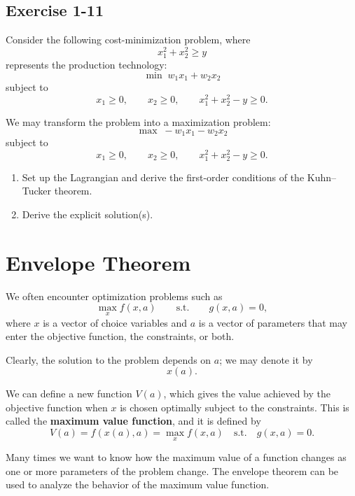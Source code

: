 \begin{tcolorbox}[breakable]

\subsection*{Exercise 1-11}

Consider the following cost-minimization problem, where
\[
x_1^2 + x_2^2 \ge y
\]
represents the production technology:
\[
\min \; w_1 x_1 + w_2 x_2
\]
subject to
\[
x_1 \ge 0,\qquad x_2 \ge 0,\qquad x_1^2 + x_2^2 - y \ge 0.
\]

We may transform the problem into a maximization problem:
\[
\max \; -w_1 x_1 - w_2 x_2
\]
subject to
\[
x_1 \ge 0,\qquad x_2 \ge 0,\qquad x_1^2 + x_2^2 - y \ge 0.
\]

\begin{enumerate}
    \item[(i)] Set up the Lagrangian and derive the first-order conditions
    of the Kuhn--Tucker theorem.
    \item[(ii)] Derive the explicit solution(s).
\end{enumerate}

\end{tcolorbox}



\section{Envelope Theorem}

We often encounter optimization problems such as
\[
\max_x f(x,a)
\qquad \text{s.t.} \qquad g(x,a)=0,
\]
where $x$ is a vector of choice variables and $a$ is a vector of parameters
that may enter the objective function, the constraints, or both.

Clearly, the solution to the problem depends on $a$; we may denote it by
\[
x(a).
\]

We can define a new function $V(a)$, which gives the value achieved by the
objective function when $x$ is chosen optimally subject to the constraints.
This is called the \textbf{maximum value function}, and it is defined by
\[
V(a)=f(x(a),a)=\max_x f(x,a)\quad \text{s.t.} \quad g(x,a)=0.
\]

Many times we want to know how the maximum value of a function changes as
one or more parameters of the problem change. The envelope theorem can be
used to analyze the behavior of the maximum value function.

